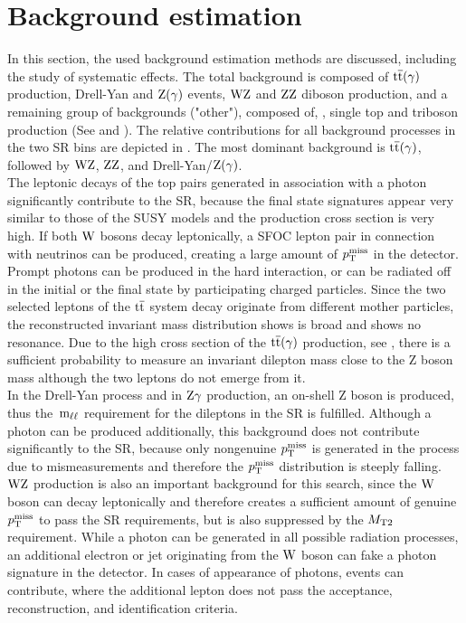 \section{Background estimation}\label{sec:BKG}
In this section, the used background estimation methods are discussed, including the study of systematic effects. The total background is composed of ${\mathrm{t}\overline{\mathrm{t}}}(\gamma)$ production, Drell-Yan and $\mathrm{Z}(\gamma)$ events, $\mathrm{W}\mathrm{Z}$ and $\mathrm{Z}\mathrm{Z}$ diboson production, and a remaining group of backgrounds ("other"), composed of, \eg, single top and triboson production (See  and ). The relative contributions for all background processes in the two SR bins are depicted in . The most dominant background is ${\mathrm{t}\overline{\mathrm{t}}}(\gamma)$, followed by $\mathrm{W}\mathrm{Z}$, $\mathrm{Z}\mathrm{Z}$, and Drell-Yan/$\mathrm{Z}(\gamma)$.\\
The leptonic decays of the top pairs generated in association with a photon significantly contribute to the SR, because the final state signatures appear very similar to those of the SUSY models and the production cross section is very high. If both $\mathrm{W}$ bosons decay leptonically, a SFOC lepton pair in connection with neutrinos can be produced, creating a large amount of $p_{\mathrm{T}}^\text{miss}$ in the detector. Prompt photons can be produced in the hard interaction, or can be radiated off in the initial or the final state by participating charged particles. Since the two selected leptons of the ${\mathrm{t}\overline{\mathrm{t}}}$ system decay originate from different mother particles, the reconstructed invariant mass distribution shows is broad and shows no resonance. Due to the high cross section of the ${\mathrm{t}\overline{\mathrm{t}}}(\gamma)$ production, see , there is a sufficient probability to measure an invariant dilepton mass close to the Z boson mass although the two leptons do not emerge from it.\\
In the Drell-Yan process and in $\mathrm{Z}\gamma$ production, an on-shell Z boson is produced, thus the $\,\text{m}_{\ell\ell}$ requirement for the dileptons in the SR is fulfilled. Although a photon can be produced additionally, this background does not contribute significantly to the SR, because only nongenuine $p_{\mathrm{T}}^\text{miss}$ is generated in the process due to mismeasurements and therefore the $p_{\mathrm{T}}^\text{miss}$ distribution is steeply falling.\\
$\mathrm{W}\mathrm{Z}$ production is also an important background for this search, since the $\mathrm{W}$ boson can decay leptonically and therefore creates a sufficient amount of genuine $p_{\mathrm{T}}^\text{miss}$ to pass the SR requirements, but is also suppressed by the $M_{\mathrm{T2}}$ requirement. While a photon can be generated in all possible radiation processes, an additional electron or jet originating from the $\mathrm{W}$ boson can fake a photon signature in the detector. In cases of appearance of photons, events can contribute, where the additional lepton does not pass the acceptance, reconstruction, and identification criteria.\\
